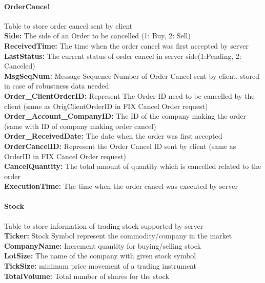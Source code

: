 \documentclass[a4paper, 11pt]{article}
\begin{document}
\paragraph*{OrderCancel}
Table to store order cancel sent by client
 \\
\textbf{Side:} The side of an Order to be cancelled (1: Buy, 2: Sell)
 \\
\textbf{ReceivedTime:} The time when the order cancel was first accepted by server
 \\
\textbf{LastStatus:} The current status of order cancel in server side(1:Pending, 2: Canceled)
 \\
\textbf{MsgSeqNum:} Message Sequence Number of Order Cancel sent by client, stored in case of robustness data needed
 \\
\textbf{Order\_ClientOrderID:} Represent The Order ID need to be cancelled by the client (same as OrigClientOrderID in FIX Cancel Order request)
 \\
\textbf{Order\_Account\_CompanyID:} The ID of the company making the order (same with ID of company making order cancel)
 \\
\textbf{Order\_ReceivedDate:} The date when the order was first accepted
 \\
\textbf{OrderCancelID:} Represent the Order Cancel ID sent by client (same as OrderID in FIX Cancel Order request)
 \\
\textbf{CancelQuantity:} The total amount of quantity which is cancelled related to the order
 \\
\textbf{ExecutionTime:} The time when the order cancel was executed by server
 
   
\paragraph*{Stock}
Table to store information of trading stock supported by server
 \\
\textbf{Ticker:} Stock Symbol represent the commodity/company in the market
 \\
\textbf{CompanyName:} Increment quantity for buying/selling stock
 \\
\textbf{LotSize:} The name of the company with given stock symbol
 \\
\textbf{TickSize:} minimum price movement of a trading instrument
 \\
\textbf{TotalVolume:} Total number of shares for the stock
 
\end{document}

